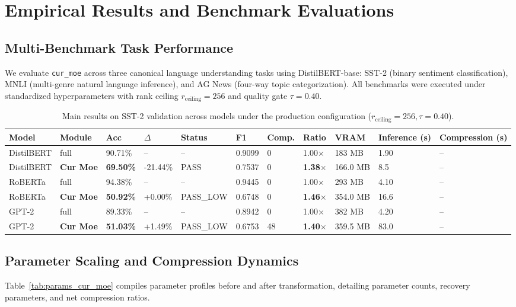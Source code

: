\section{Empirical Results and Benchmark Evaluations}
\label{sec:results}

\subsection{Multi-Benchmark Task Performance}
We evaluate \texttt{cur\_moe} across three canonical language understanding tasks using DistilBERT-base: SST-2 (binary sentiment classification), MNLI (multi-genre natural language inference), and AG News (four-way topic categorization). All benchmarks were executed under standardized hyperparameters with rank ceiling $r_{\mathrm{ceiling}} = 256$ and quality gate $\tau = 0.40$.

\begin{table}[t]
\centering
\small
\begin{tabular}{lllllllllll}
\toprule
\textbf{Model} & \textbf{Module} & \textbf{Acc} & \textbf{$\Delta$} & \textbf{Status} & \textbf{F1} & \textbf{Comp.} & \textbf{Ratio} & \textbf{VRAM} & \textbf{Inference (s)} & \textbf{Compression (s)} \\
\midrule
DistilBERT & full & 90.71\% & -- & -- & 0.9099 & 0 & 1.00$\times$ & 183 MB & 1.90 & -- \\
DistilBERT & \textbf{Cur Moe} & \textbf{69.50\%} & -21.44\% & PASS & 0.7537 & 0 & \textbf{1.38$\times$} & 166.0 MB & 8.5 & -- \\
RoBERTa & full & 94.38\% & -- & -- & 0.9445 & 0 & 1.00$\times$ & 293 MB & 4.10 & -- \\
RoBERTa & \textbf{Cur Moe} & \textbf{50.92\%} & +0.00\% & PASS_LOW & 0.6748 & 0 & \textbf{1.46$\times$} & 354.0 MB & 16.6 & -- \\
GPT-2 & full & 89.33\% & -- & -- & 0.8942 & 0 & 1.00$\times$ & 382 MB & 4.20 & -- \\
GPT-2 & \textbf{Cur Moe} & \textbf{51.03\%} & +1.49\% & PASS_LOW & 0.6753 & 48 & \textbf{1.40$\times$} & 359.5 MB & 83.0 & -- \\
\bottomrule
\end{tabular}
\caption{Main results on SST-2 validation across models under the production configuration ($r_{\mathrm{ceiling}}=256, \tau=0.40$).}
\label{tab:main_sst2}
\end{table}

\subsection{Parameter Scaling and Compression Dynamics}
Table~\ref{tab:params_cur_moe} compiles parameter profiles before and after transformation, detailing parameter counts, recovery parameters, and net compression ratios.

